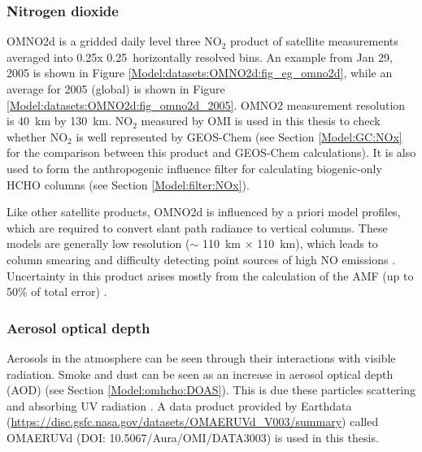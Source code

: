     \subsubsection{Nitrogen dioxide}
      \label{Model:datasets:OMNO2d}
      OMNO2d is a gridded daily level three NO$_2$ product of satellite measurements averaged into 0.25\degr x 0.25\degr ~horizontally resolved bins.
      An example from Jan 29, 2005 is shown in Figure \ref{Model:datasets:OMNO2d:fig_eg_omno2d}, while an average for 2005 (global) is shown in Figure \ref{Model:datasets:OMNO2d:fig_omno2d_2005}.
      OMNO2 measurement resolution is 40~km by 130~km.
      NO$_2$ measured by OMI is used in this thesis to check whether NO$_2$ is well represented by GEOS-Chem (see Section \ref{Model:GC:NOx} for the comparison between this product and GEOS-Chem calculations).
      It is also used to form the anthropogenic influence filter for calculating biogenic-only HCHO columns (see Section \ref{Model:filter:NOx}).
      
      
      
      
      Like other satellite products, OMNO2d is influenced by a priori model profiles, which are required to convert slant path radiance to vertical columns.
      These models are generally low resolution ($\sim$ 110~km $\times$ 110~km), which leads to column smearing and difficulty detecting point sources of high NO emissions \parencite{Goldberg2018}.
      Uncertainty in this product arises mostly from the calculation of the AMF (up to 50\% of total error) \parencite{Lorente2017}.
    
    \subsubsection{Aerosol optical depth}
      \label{Model:datasets:OMAERUVd}
      
      Aerosols in the atmosphere can be seen through their interactions with visible radiation. 
      Smoke and dust can be seen as an increase in aerosol optical depth (AOD) (see Section \ref{Model:omhcho:DOAS}).
      This is due these particles scattering and absorbing UV radiation \parencite{Ahn2008}.
      A data product provided by Earthdata (\url{https://disc.gsfc.nasa.gov/datasets/OMAERUVd_V003/summary}) called OMAERUVd (DOI: 10.5067/Aura/OMI/DATA3003) is used in this thesis. 
      
